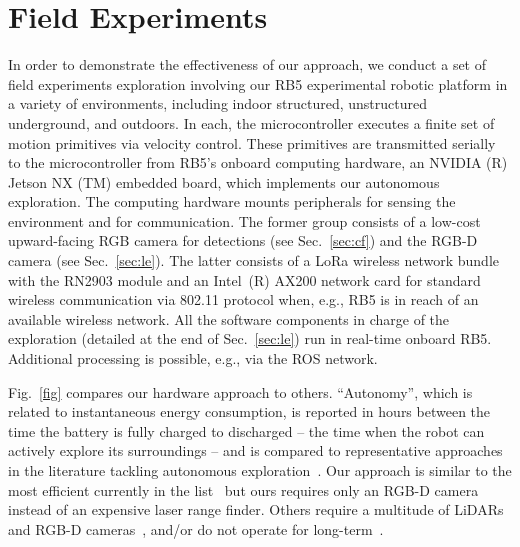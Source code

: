 \documentclass[letterpaper,10pt,conference,twoside]{IEEEtran}
\theoremstyle{definition}
\begin{document}
\section{Field Experiments}
\label{sec:fe}
\noindent
In order to demonstrate the effectiveness of our approach, we conduct a set of 
field experiments %
exploration involving our RB5 experimental robotic platform %
in a variety of environments, including indoor structured, unstructured underground, and outdoors. In each, the microcontroller executes a finite set of motion primitives via velocity control. These primitives are transmitted serially to the microcontroller 
from RB5's onboard computing hardware, an NVIDIA (R) Jetson NX (TM) embedded board, which implements our autonomous %
exploration. %
The computing hardware mounts peripherals for sensing the environment and for communication. The former group consists of a low-cost upward-facing RGB camera for detections (see Sec.~\ref{sec:cf}) and the RGB-D camera (see Sec.~\ref{sec:le}). The latter 
consists 
of a LoRa wireless network bundle with the RN2903 module and an Intel~(R) AX200 network card for standard wireless communication via 802.11 protocol when, e.g., RB5 is in reach of an available wireless network.
%
All the software components in charge of the exploration %
(detailed at the end of Sec.~\ref{sec:le}) run in real-time onboard RB5. Additional processing is possible, e.g., %
via the ROS network.

Fig.~\ref{fig} compares our hardware approach to others. 
``Autonomy'', which is related to instantaneous energy consumption, is reported in hours between the time the battery is fully charged to discharged -- the time when the robot can actively explore its surroundings -- and is compared to representative approaches in the literature tackling autonomous exploration~\cite{schmid2020efficient,kulkarni2022autonomous,muller2021openbot,tranzatto2022cerberus,roucek2020darpa,surmann2003autonomous}.
Our approach is similar 
to the most efficient currently in the list~\cite{surmann2003autonomous} %
but ours requires only an RGB-D camera instead of an 
expensive %
laser range finder. Others require a multitude of LiDARs and RGB-D cameras~\cite{tranzatto2022cerberus,kulkarni2022autonomous,roucek2020darpa}, and/or do not operate for long-term~\cite{schmid2020efficient,muller2021openbot}.
\end{document}

